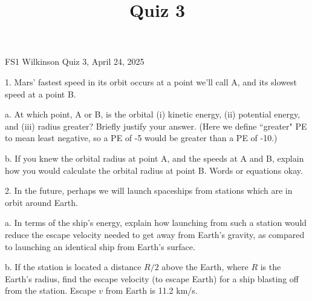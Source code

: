 \documentclass[12pt]{article}
\title{Quiz 3}
\begin{document}
\setlength{\parindent}{0pt}
\setlength{\parskip}{3mm}

FS1 Wilkinson Quiz 3, April 24, 2025

1. Mars' fastest speed in its orbit occurs at a point we'll call A, and its slowest speed at a point B. 

a. At which point, A or B, is the orbital (i) kinetic energy, (ii) potential energy, and (iii) radius greater? Briefly justify your answer. (Here we define ``greater" PE to mean least negative, so a PE of -5 would be greater than a PE of -10.)


\bigskip
\bigskip
\bigskip
\bigskip
\bigskip
\bigskip
\bigskip
\bigskip
\bigskip


b. If you knew the orbital radius at point A, and the speeds at A and B, explain how you would calculate the orbital radius at point B. Words or equations okay.

\bigskip
\bigskip
\bigskip
\bigskip
\bigskip
\bigskip
\bigskip
\bigskip
\bigskip


2. In the future, perhaps we will launch spaceships from stations which are in orbit around Earth. 

a. In terms of the ship's energy, explain how launching from such a station would reduce the escape velocity needed to get away from Earth's gravity, as compared to launching an identical ship from Earth's surface.


\bigskip
\bigskip
\bigskip
\bigskip
\bigskip
\bigskip
\bigskip
\bigskip
\bigskip

b. If the station is located a distance $R/2$ above the Earth, where $R$ is the Earth's radius, find the escape velocity (to escape Earth) for a ship blasting off from the station. Escape $v$ from Earth is 11.2 km/s. 
\end{document}
